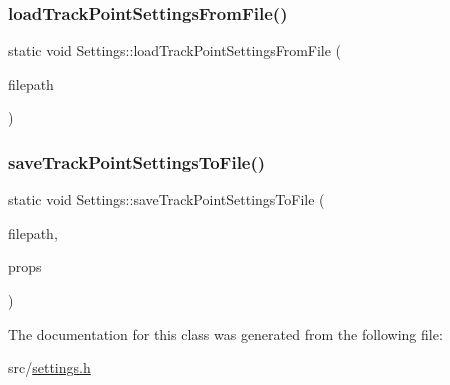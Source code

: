 \mbox{\label{class_settings_ab88eeef4bd30306c8774f42f9c782ee0}} 
\subsubsection{\texorpdfstring{loadTrackPointSettingsFromFile()}{loadTrackPointSettingsFromFile()}}
{\footnotesize\ttfamily static void Settings\+::load\+Track\+Point\+Settings\+From\+File (\begin{DoxyParamCaption}\item[{Q\+String \&}]{filepath }\end{DoxyParamCaption})\hspace{0.3cm}{\ttfamily [static]}}

\mbox{\label{class_settings_a6ed7797f46dd5c071828242363f0b69c}} 
\subsubsection{\texorpdfstring{saveTrackPointSettingsToFile()}{saveTrackPointSettingsToFile()}}
{\footnotesize\ttfamily static void Settings\+::save\+Track\+Point\+Settings\+To\+File (\begin{DoxyParamCaption}\item[{Q\+String \&}]{filepath,  }\item[{\mbox{\hyperlink{struct_track_point_property}{Track\+Point\+Property}} \&}]{props }\end{DoxyParamCaption})\hspace{0.3cm}{\ttfamily [static]}}



The documentation for this class was generated from the following file\+:\begin{DoxyCompactItemize}
\item 
src/\mbox{\hyperlink{settings_8h}{settings.\+h}}\end{DoxyCompactItemize}
